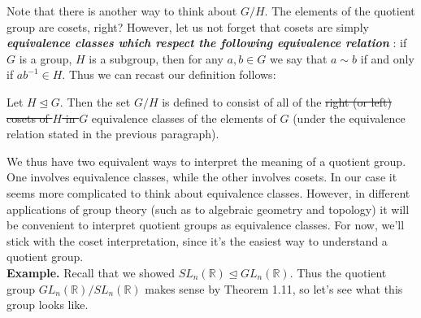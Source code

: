 \documentclass[12pt,letterpaper]{algebra_book}
\newcommand{\normal}{\unlhd}
\theoremstyle{definition}
\begin{document}
   {\color{NavyBlue} Note that there is another way to think about $G/H$. The elements
    of the quotient group are cosets, right? However, let us not forget
   that cosets are simply \textbf{\textit{equivalence classes which
   respect the following equivalence relation}} }: {\color{Black} if $G$ is a group, $H$ is a
   subgroup, then for any $a, b \in G$ we say that $a \sim
    b$ if and only if $ab^{-1} \in H$.} {\color{NavyBlue} Thus we can
    recast our definition follows:}
    \\
    
    \begingroup
    \par
    \rightskip\leftskip
    \noindent Let $H \normal G$. Then the set $G/H$ is defined to consist of all
    of the
    \sout{right (or left) cosets of $H$ in $G$} equivalence classes of
    the elements of $G$ (under the equivalence relation stated in the
    previous paragraph). 
    \par
    \endgroup
    \vspace{1cm}

    {\color{Violet}We thus have two equivalent ways to interpret the meaning of a
    quotient group. One involves equivalence classes, while the other
    involves cosets. In our case it seems more complicated to think
    about equivalence classes.
    However, in different applications of group theory (such
    as to algebraic geometry and topology) it will be convenient to
    interpret quotient groups as equivalence classes. For now, we'll
    stick with the coset interpretation, since it's the easiest way to
    understand a quotient group.
    }
    \\ 

    \textbf{Example.} Recall that we showed $SL_n(\mathbb{R}) \normal
    GL_n(\mathbb{R})$. Thus the quotient group
    $GL_n(\mathbb{R})/SL_n(\mathbb{R})$ makes sense by Theorem 1.11,
    so let's see what this group looks like.
\end{document}
